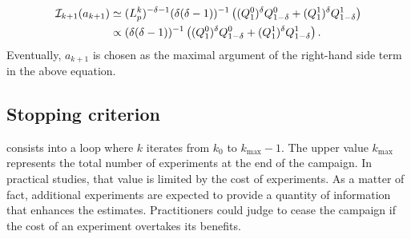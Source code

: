     \begin{align}
        \cI_{k+1}(a_{k+1})&\simeq (L^k_p)^{-\delta-1}  %
        (\delta(\delta-1))^{-1} \left((Q^0_1)^{\delta} Q^0_{1-\delta} + (Q^1_1)^{\delta} Q^1_{1-\delta}\right)\\
        &\propto (\delta(\delta-1))^{-1} \left((Q^0_1)^{\delta} Q^0_{1-\delta} + (Q^1_1)^{\delta} Q^1_{1-\delta}\right).\nonumber
    \end{align}
Eventually, $a_{k+1}$ is chosen as the maximal argument of the right-hand side term in the above equation.





    


\subsection{{Stopping} criterion \label{sec:doe:stopping_crit}}

 consists into a loop where $k$ iterates from $k_0$ to $k_{\max}-1$. The upper value $k_{\max}$ represents the total number of experiments at the end of the campaign. 
In practical studies, that value is limited by the cost of experiments.
%
As a matter of fact, additional experiments are expected to provide a quantity of information that enhances the estimates. %
Practitioners could judge to cease the campaign if the cost of an experiment overtakes its benefits.

